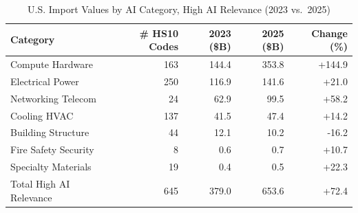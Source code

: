 \begin{table}[htbp]
\centering
\caption{U.S. Import Values by AI Category, High AI Relevance (2023 vs.\ 2025)}
\label{tab:trade_by_category}
\setlength{\tabcolsep}{4.5mm}
\renewcommand{\arraystretch}{1.60}
\begin{tabular}{lrrrr}
\toprule
Category & \# HS10 Codes & 2023 (\$B) & 2025 (\$B) & Change (\%) \\
\midrule
Compute Hardware & 163 & 144.4 & 353.8 & +144.9 \\
Electrical Power & 250 & 116.9 & 141.6 & +21.0 \\
Networking Telecom & 24 & 62.9 & 99.5 & +58.2 \\
Cooling HVAC & 137 & 41.5 & 47.4 & +14.2 \\
Building Structure & 44 & 12.1 & 10.2 & -16.2 \\
Fire Safety Security & 8 & 0.6 & 0.7 & +10.7 \\
Specialty Materials & 19 & 0.4 & 0.5 & +22.3 \\
\midrule
Total High AI Relevance & 645 & 379.0 & 653.6 & +72.4 \\
\bottomrule
\end{tabular}
\end{table}
